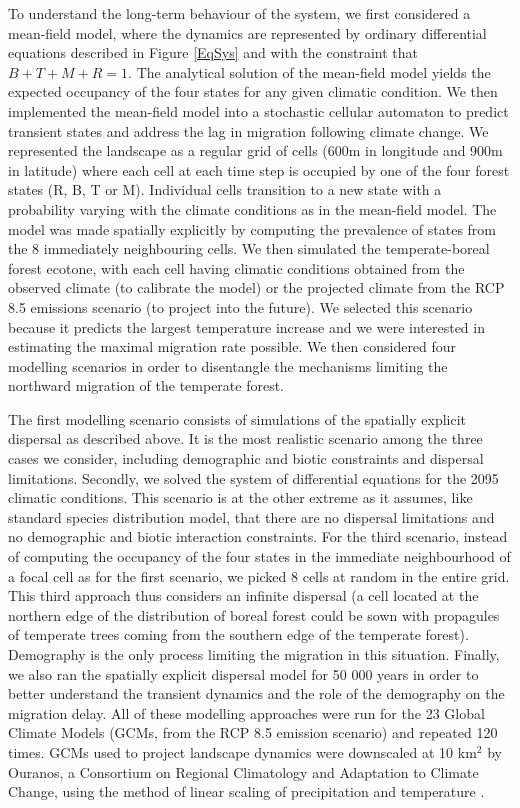 To understand the long-term behaviour of the system, we first considered a mean-field model, where
the dynamics are represented by ordinary differential equations described in Figure \ref{EqSys} and
with the constraint that $B + T + M + R = 1$. The analytical solution of the mean-field model yields
the expected occupancy of the four states for any given climatic condition. We then implemented the
mean-field model into a stochastic cellular automaton to predict transient states and address the
lag in migration following climate change. We represented the landscape as a regular grid of cells
(600m in longitude and 900m in latitude) where each cell at each time step is occupied by one of the
four forest states (R, B, T or M). Individual cells transition to a new state with a probability
varying with the climate conditions as in the mean-field model. The model was made spatially
explicitly by computing the prevalence of states from the 8 immediately neighbouring cells. We then
simulated the temperate-boreal forest ecotone, with each cell having climatic conditions obtained
from the observed climate (to calibrate the model) or the projected climate from the RCP 8.5
emissions scenario \citep{Taylor2012} (to project into the future). We selected this scenario
because it predicts the largest temperature increase and we were interested in estimating the
maximal migration rate possible. We then considered four modelling scenarios in order to disentangle
the mechanisms limiting the northward migration of the temperate forest.

The first modelling scenario consists of simulations of the spatially explicit dispersal as
described above. It is the most realistic scenario among the three cases we consider, including
demographic and biotic constraints and dispersal limitations. Secondly, we solved the system of
differential equations for the 2095 climatic conditions. This scenario is at the other extreme as it
assumes, like standard species distribution model, that there are no dispersal limitations and no
demographic and biotic interaction constraints. For the third scenario, instead of computing the
occupancy of the four states in the immediate neighbourhood of a focal cell as for the first
scenario, we picked 8 cells at random in the entire grid. This third approach thus considers an
infinite dispersal (a cell located at the northern edge of the distribution of boreal forest could
be sown with propagules of temperate trees coming from the southern edge of the temperate forest).
Demography is the only process limiting the migration in this situation. Finally, we also ran the
spatially explicit dispersal model for 50 000 years in order to better understand the transient
dynamics and the role of the demography on the migration delay. All of these modelling approaches
were run for the 23 Global Climate Models (GCMs, from the RCP 8.5 emission scenario) and repeated
120 times. GCMs used to project landscape dynamics were downscaled at 10 km$^2$ by Ouranos, a
Consortium on Regional Climatology and Adaptation to Climate Change, using the method of linear
scaling of precipitation and temperature \citep[Method description in][]{Teutschbein2012}.

